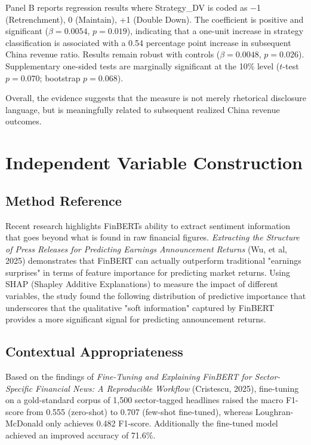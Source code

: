 \documentclass{article}
\begin{document}
Panel B reports regression results where Strategy\_DV is coded as $-$1
(Retrenchment), 0 (Maintain), +1 (Double Down). The coefficient is
positive and significant ($\beta = 0.0054$, $p = 0.019$), indicating that a
one-unit increase in strategy classification is associated with a 0.54
percentage point increase in subsequent China revenue ratio. Results
remain robust with controls ($\beta = 0.0048$, $p = 0.026$). Supplementary
one-sided tests are marginally significant at the 10\% level ($t$-test $p = 0.070$; bootstrap $p = 0.068$).

Overall, the evidence suggests that the measure is not merely rhetorical
disclosure language, but is meaningfully related to subsequent realized
China revenue outcomes.

\newpage
\section{Independent Variable Construction}\label{independent-variable-construction}

\subsection{Method Reference}\label{method-reference}

Recent research highlights FinBERT\textquotesingle s ability to extract
sentiment information that goes beyond what is found in raw financial
figures. \emph{Extracting the Structure of Press Releases for Predicting
Earnings Announcement Returns} (Wu, et al, 2025) demonstrates that
FinBERT can actually outperform traditional "earnings surprises" in
terms of feature importance for predicting market returns. Using SHAP
(Shapley Additive Explanations) to measure the impact of different
variables, the study found the following distribution of predictive
importance that underscores that the qualitative "soft information"
captured by FinBERT provides a more significant signal for predicting
announcement returns.

\subsection{Contextual Appropriateness}\label{contextual-appropriateness}

Based on the findings of \emph{Fine-Tuning and Explaining FinBERT
for Sector-Specific Financial News: A Reproducible Workflow} (Cristescu,
2025), fine-tuning on a gold-standard corpus of 1,500 sector-tagged
headlines raised the macro F1-score from 0.555 (zero-shot) to 0.707
(few-shot fine-tuned), whereas Loughran-McDonald only achieves 0.482
F1-score. Additionally the fine-tuned model achieved an improved
accuracy of 71.6\%.
\end{document}
